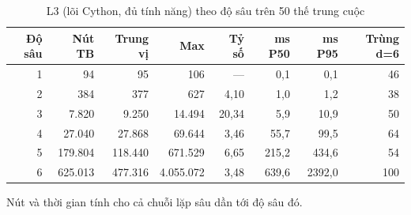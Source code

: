 \begin{table}[H]
  \centering
  \footnotesize
  \caption{L3 (lõi Cython, đủ tính năng) theo độ sâu trên 50 thế trung cuộc}
  \label{tab:cs-tk-dosau}
  \begin{tabular}{rrrrrrrr}
    \toprule
    Độ sâu & Nút TB & Trung vị & Max & Tỷ số & ms P50 & ms P95 & Trùng d=6 \\
    \midrule
    1 & 94 & 95 & 106 & --- & 0,1 & 0,1 & 46 \\
    2 & 384 & 377 & 627 & 4,10 & 1,0 & 1,2 & 38 \\
    3 & 7.820 & 9.250 & 14.494 & 20,34 & 5,9 & 10,9 & 50 \\
    4 & 27.040 & 27.868 & 69.644 & 3,46 & 55,7 & 99,5 & 64 \\
    5 & 179.804 & 118.440 & 671.529 & 6,65 & 215,2 & 434,6 & 54 \\
    6 & 625.013 & 477.316 & 4.055.072 & 3,48 & 639,6 & 2392,0 & 100 \\
    \bottomrule
  \end{tabular}
  \par\smallskip\parbox{.95\linewidth}{\footnotesize Nút và thời gian tính cho cả chuỗi lặp sâu dần tới độ sâu đó.}
\end{table}
